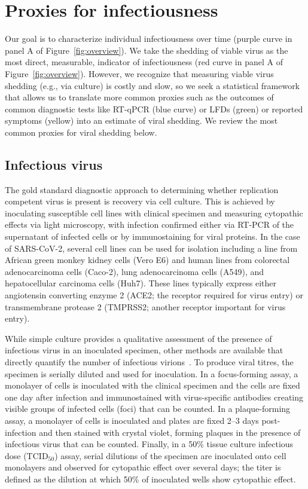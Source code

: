 \documentclass[12pt]{article}
\begin{document}
\section{Proxies for infectiousness} \label{sec:proxies}
Our goal is to characterize individual infectiousness over time (purple curve in panel A of Figure~\ref{fig:overview}). We take the shedding of viable virus as the most direct, measurable, indicator of infectiousness (red curve in panel A of Figure~\ref{fig:overview}). However, we recognize that measuring viable virus shedding (e.g., via culture) is costly and slow, so we seek a statistical framework that allows us to translate more common proxies such as the outcomes of common diagnostic tests like RT-qPCR (blue curve) or LFDs (green) or reported symptoms (yellow) into an estimate of viral shedding. We review the most common proxies for viral shedding below.

\subsection{Infectious virus}
The gold standard diagnostic approach to determining whether replication competent virus is present is recovery via cell culture. This is achieved by inoculating susceptible cell lines with clinical specimen and measuring cytopathic effects via light microscopy, with infection confirmed either via RT-PCR of the supernatant of infected cells or by immunostaining for viral proteins. In the case of SARS-CoV-2, several cell lines can be used for isolation including a line from African green monkey kidney cells (Vero E6) and human lines from colorectal adenocarcinoma cells (Caco-2), lung adenocarcinoma cells (A549), and hepatocellular carcinoma cells (Huh7). These lines typically express either angiotensin converting enzyme 2 (ACE2; the receptor required for virus entry) or transmembrane protease 2 (TMPRSS2; another receptor important for virus entry).

While simple culture provides a qualitative assessment of the presence of infectious virus in an inoculated specimen, other methods are available that directly quantify the number of infectious virions~\cite{wolk2020sars,bullard2020predicting}. To produce viral titres, the specimen is serially diluted and used for inoculation. In a focus-forming assay, a monolayer of cells is inoculated with the clinical specimen and the cells are fixed one day after infection and immunostained with virus-specific antibodies creating visible groups of infected cells (foci) that can be counted. In a plaque-forming assay, a monolayer of cells is inoculated and plates are fixed 2--3 days post-infection and then stained with crystal violet, forming plaques in the presence of infectious virus that can be counted. Finally, in a 50\% tissue culture infectious dose (TCID$_{50}$) assay, serial dilutions of the specimen are inoculated onto cell monolayers and observed for cytopathic effect over several days; the titer is defined as the dilution at which 50\% of inoculated wells show cytopathic effect.
\end{document}
